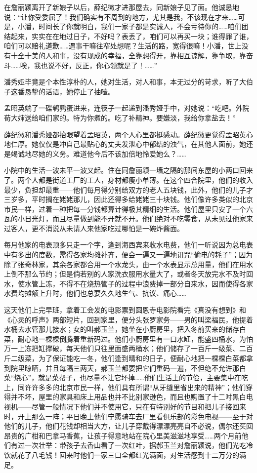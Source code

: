 \par 在詹丽颖离开了新娘子以后，薛纪徽才进那屋去，同新娘子见了面。他诚恳地说：“让你受委屈了！我们确实有不周到的地方，尤其是我，不该现在才来……可是，小潘，时间长了你就明白，我们一家子都是实诚人，不会亏待你的……咱们团结起来，实实在在地过日子，不好吗？表丢了，咱们可以再买一块；谁得罪了谁，咱们可以赔礼道歉……遇事干嘛往窄处想呢？生活的路，宽得很嘛！小潘，世上没有十全十美的人和事，没有现成的幸福，全靠想得开，靠相互谅解，靠争取，靠奋斗……唉，我也说不好，反正，你心领就是了！……”
\par 潘秀娅毕竟是个本性淳朴的人，她对生活，对人和事，本无过分的苛求，听了大伯子这番恳挚的话语，她停止了抽噎。
\par 孟昭英端了一碟鹌鹑蛋进来，连筷子一起递到潘秀娅手中，对她说：“吃吧。外院荀大婶送给咱们家的。特为你煮的。吃了补精神。要嫌淡，我给你拿盐去！”
\par 薛纪徽和潘秀娅都抬眼望着孟昭英，两个人心里都挺感动。薛纪徽更觉得孟昭英心地仁厚。她仅仅是冲自己最贴心的丈夫发泄心中郁结的浊气，在其他人面前，她还是竭诚地尽她的义务。难道他今后不该加倍地怜爱她么？……
\par 小院中的生活一波未平一波又起。住在同詹丽颖一墙之隔的那间东屋的小两口回来了。两个人都是街道工厂的工人，身材都瘦小单薄。在这个四合院里，他们的收入最少，负担却最重——他们每月得分别给双方的老人五块钱，此外，他们的儿子才三岁多，平时搁在姥姥那儿，因此还得多给姥姥三十块钱。他们像许多类似的北京市民一样，过着一种把每一分钱都算计得极其精细的生活。他们屋里只安了一个六瓦的小日光灯，而且尽量做到能不开就不开。他们绝对不吃零食，从未见过他家来过客人，更不消说从未请人来他家吃过哪怕是一碗炸酱面。
\par 每月他家的电表顶多只走一个字，逢到海西宾来收水电费，他们一听说因为总电表中有多出的度数，需得各家均摊补齐，便会一遍又一遍地诅咒“偷电的耗子”；因为除了张奇林家，其余各家都合用一个水龙头，由一个水表显示总用量，他们在用水上倒不那么节约；但是倘若别的人家洗衣服用水量大了，或者冬天放完水不及时回水，使水管上冻，不得不在烧热管子的过程中浪费掉一部分自来水，因而使得各家水费均摊额上升时，他们也总要久久地生气、抗议、痛心……
\par 这天他们上完早班，拿着工会发的电影票到圆恩寺电影院看完《真没有想到》和《心灵的呼声》两部短片，回到家里，便分头张罗家务——男的叫梁福民，他提着水桶去水管那儿接水；女的叫郝玉兰，她坐在小厨房里，把入冬前买来的储存白菜，耐心地一棵棵倒腾着重新码过。他们小厨房里有一口水缸，能盛四桶水，为怕万一上冻把缸撑破，每天他们只往里面盛两桶水；他们储存了一百斤一级菜、二百斤二级菜，为了保证能吃一冬，他们逢到晴和的日子，便耐心地把一棵棵白菜都拿到院里晾晒，并且每隔三两天，郝玉兰都要把它们重码一遍，不但绝不允许那白菜“烧心”，就是菜帮子，也尽量不让它坏掉……他们生活上的节俭，主要集中在吃上，同许许多多的北京市民一样，他们具有所谓“从牙缝里省出来的精神”；他们穿得并不坏，屋里的家具和床上用品也并不比别家逊色，而且也购置了十二吋黑白电视机——尽管一般情况下他们并不使用它，只在有特别好的节目和把儿子接回来时，开上那么一阵；平日晚上他们宁愿骑车去厂里看俱乐部的彩色电视——至于对他们的儿子，他们花钱却相当大方，让儿子穿戴得漂漂亮亮自不必说，偶尔还买回昂贵的广柑和巴拿马香蕉，让孩子得意地站在院心里美滋滋地享受……两个月前他们有过一次壮举：带孩子去香山看了一次红叶，据郝玉兰对詹丽颖说，他们光吃冷饮就花了八毛钱！回来时他们一家三口全都红光满面，对生活感到十二万分的满足。
